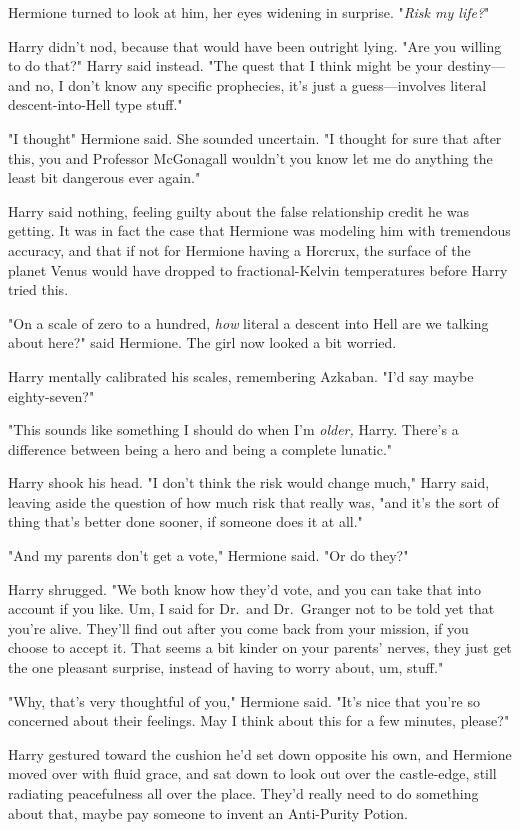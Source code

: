 Hermione turned to look at him, her eyes widening in surprise. "\emph{Risk my
life?}"

Harry didn't nod, because that would have been outright lying. "Are you willing
to do that?" Harry said instead. "The quest that I think might be your
destiny---and no, I don't know any specific prophecies, it's just a
guess---involves literal descent-into-Hell type stuff."

"I thought{\el}" Hermione said. She sounded uncertain. "I thought for sure
that after this, you and Professor McGonagall wouldn't{\el} you know{\el}
let me do anything the least bit dangerous ever again."

Harry said nothing, feeling guilty about the false relationship credit he was
getting. It was in fact the case that Hermione was modeling him with tremendous
accuracy, and that if not for Hermione having a Horcrux, the surface of the
planet Venus would have dropped to fractional-Kelvin temperatures before Harry
tried this.

"On a scale of zero to a hundred, \emph{how} literal a descent into Hell are we
talking about here?" said Hermione. The girl now looked a bit worried.

Harry mentally calibrated his scales, remembering Azkaban. "I'd say maybe
eighty-seven?"

"This sounds like something I should do when I'm \emph{older,} Harry. There's a
difference between being a hero and being a complete lunatic."

Harry shook his head. "I don't think the risk would change much," Harry said,
leaving aside the question of how much risk that really was, "and it's the sort
of thing that's better done sooner, if someone does it at all."

"And my parents don't get a vote," Hermione said. "Or do they?"

Harry shrugged. "We both know how they'd vote, and you can take that into
account if you like. Um, I said for Dr.~and Dr.~Granger not to be told yet that
you're alive. They'll find out after you come back from your mission, if you
choose to accept it. That seems a bit{\el} kinder on your parents' nerves,
they just get the one pleasant surprise, instead of having to worry about, um,
stuff."

"Why, that's very thoughtful of you," Hermione said. "It's nice that you're so
concerned about their feelings. May I think about this for a few minutes,
please?"

Harry gestured toward the cushion he'd set down opposite his own, and Hermione
moved over with fluid grace, and sat down to look out over the castle-edge,
still radiating peacefulness all over the place. They'd really need to do
something about that, maybe pay someone to invent an Anti-Purity Potion.

